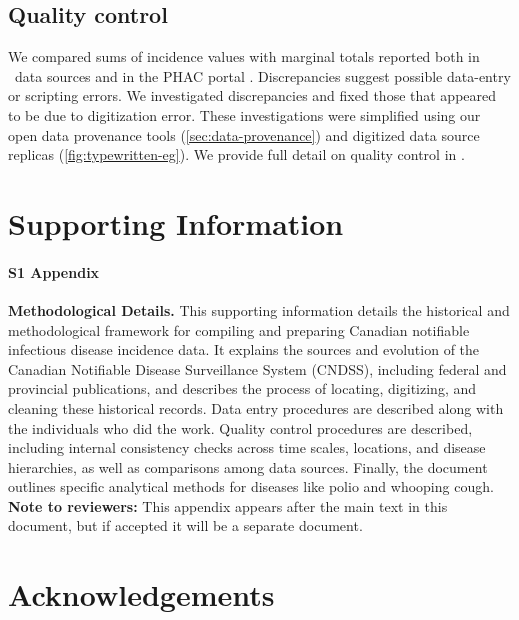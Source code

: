 \documentclass[12pt]{article}
\begin{document}
\subsection{Quality control}\label{sec:quality-control}

We compared sums of incidence values with marginal totals reported both in \datacronym\ data sources and in the PHAC portal \cite{totten2019updates}. Discrepancies suggest possible data-entry or scripting errors. We investigated discrepancies and fixed those that appeared to be due to digitization error. These investigations were simplified using our open data provenance tools (\cref{sec:data-provenance}) and digitized data source replicas (\cref{fig:typewritten-eg}). We provide full detail on quality control in .

\section{Supporting Information}

\paragraph*{S1 Appendix}\label{S1_Appendix}
{\bf Methodological Details.} This supporting information details the historical and methodological framework for compiling and preparing Canadian notifiable infectious disease incidence data. It explains the sources and evolution of the Canadian Notifiable Disease Surveillance System (CNDSS), including federal and provincial publications, and describes the process of locating, digitizing, and cleaning these historical records. Data entry procedures are described along with the individuals who did the work. Quality control procedures are described, including internal consistency checks across time scales, locations, and disease hierarchies, as well as comparisons among data sources. Finally, the document outlines specific analytical methods for diseases like polio and whooping cough. {\bf Note to reviewers:} This appendix appears after the main text in this document, but if accepted it will be a separate document.


\section*{Acknowledgements}
\end{document}
